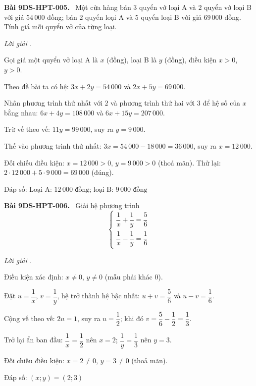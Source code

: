 \documentclass[12pt,a4paper]{article}
\newenvironment{problem}[1][]{\par\medskip\noindent\textbf{Bài #1.}\ }{\par}
\newenvironment{solution}[1][]{\par\noindent\textit{Lời giải #1.}\par}{\par}
\begin{document}
\begin{problem}[9DS-HPT-005]
Một cửa hàng bán $3$ quyển vở loại A và $2$ quyển vở loại B với giá $54\,000$ đồng; bán $2$ quyển loại A và $5$ quyển loại B với giá $69\,000$ đồng. Tính giá mỗi quyển vở của từng loại.

\begin{solution}
Gọi giá một quyển vở loại A là $x$ (đồng), loại B là $y$ (đồng), điều kiện $x > 0$, $y > 0$.

Theo đề bài ta có hệ: $3x + 2y = 54\,000$ và $2x + 5y = 69\,000$.

Nhân phương trình thứ nhất với $2$ và phương trình thứ hai với $3$ để hệ số của $x$ bằng nhau: $6x + 4y = 108\,000$ và $6x + 15y = 207\,000$.

Trừ vế theo vế: $11y = 99\,000$, suy ra $y = 9\,000$.

Thế vào phương trình thứ nhất: $3x = 54\,000 - 18\,000 = 36\,000$, suy ra $x = 12\,000$.

Đối chiếu điều kiện: $x = 12\,000 > 0$, $y = 9\,000 > 0$ (thoả mãn). Thử lại: $2 \cdot 12\,000 + 5 \cdot 9\,000 = 69\,000$ (đúng).

Đáp số: $\boxed{\text{Loại A: } 12\,000 \text{ đồng; loại B: } 9\,000 \text{ đồng}}$
\end{solution}
\end{problem}

\begin{problem}[9DS-HPT-006]
Giải hệ phương trình
\[ \begin{cases} \dfrac{1}{x} + \dfrac{1}{y} = \dfrac{5}{6} \\ \dfrac{1}{x} - \dfrac{1}{y} = \dfrac{1}{6} \end{cases} \]

\begin{solution}
Điều kiện xác định: $x \neq 0$, $y \neq 0$ (mẫu phải khác $0$).

Đặt $u = \dfrac{1}{x}$, $v = \dfrac{1}{y}$, hệ trở thành hệ bậc nhất: $u + v = \dfrac{5}{6}$ và $u - v = \dfrac{1}{6}$.

Cộng vế theo vế: $2u = 1$, suy ra $u = \dfrac{1}{2}$; khi đó $v = \dfrac{5}{6} - \dfrac{1}{2} = \dfrac{1}{3}$.

Trở lại ẩn ban đầu: $\dfrac{1}{x} = \dfrac{1}{2}$ nên $x = 2$; $\dfrac{1}{y} = \dfrac{1}{3}$ nên $y = 3$.

Đối chiếu điều kiện: $x = 2 \neq 0$, $y = 3 \neq 0$ (thoả mãn).

Đáp số: $\boxed{(x; y) = (2; 3)}$
\end{solution}
\end{problem}
\end{document}
